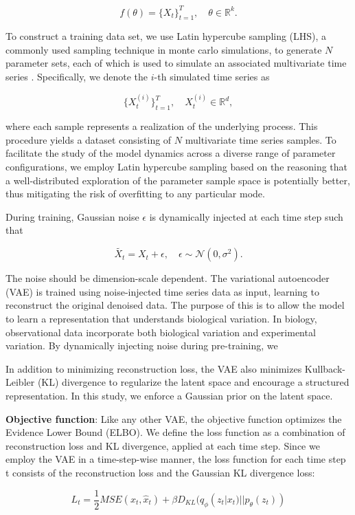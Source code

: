 \documentclass[12pt]{article} %
\begin{document}
$$
f(\theta) = \{X_t\}_{t=1}^T, \quad \theta \in \mathbb{R}^k.
$$  

To construct a training data set, we use Latin hypercube sampling (LHS), a commonly used sampling technique in monte carlo simulations, to generate \( N \)  parameter sets, each of which is used to simulate an associated multivariate time series \citep{}. Specifically, we denote the \( i \)-th simulated time series as  

$$
\{X_{t}^{(i)}\}_{t=1}^T, \quad X_t^{(i)} \in \mathbb{R}^d,
$$  

where each sample represents a realization of the underlying process. This procedure yields a dataset consisting of \( N \) multivariate time series samples. To facilitate the study of the model dynamics across a diverse range of parameter configurations, we employ Latin hypercube sampling based on the reasoning that a well-distributed exploration of the parameter sample space is potentially better, thus mitigating the risk of overfitting to any particular mode\citep{mckay2000comparison}. 

During training, Gaussian noise \( \epsilon \) is dynamically injected at each time step such that  

$$
\tilde{X_t} = X_t + \epsilon, \quad \epsilon \sim \mathcal{N}(0, \sigma^2).
$$  

The noise should be dimension-scale dependent. The variational autoencoder (VAE) is trained using noise-injected time series data as input, learning to reconstruct the original denoised data. The purpose of this is to allow the model to learn a representation that understands biological variation. In biology, observational data incorporate both biological variation and experimental variation. By dynamically injecting noise during pre-training, we

In addition to minimizing reconstruction loss, the VAE also minimizes Kullback-Leibler (KL) divergence to regularize the latent space and encourage a structured representation. In this study, we enforce a Gaussian prior on the latent space.

\textbf{Objective function}: Like any other VAE, the objective function optimizes the Evidence Lower Bound (ELBO). We define the loss function as a combination of reconstruction loss and KL divergence, applied at each time step. Since we employ the VAE in a time-step-wise manner, the loss function for each time step t consists of the reconstruction loss and the Gaussian KL divergence loss:

$$L_t = \frac{1}{2}MSE(x_t, \hat x_t) + \beta D_{KL}(q_{\phi}(z_{t}|x_{t})||p_{\theta}(z_{t}))$$
\end{document}
